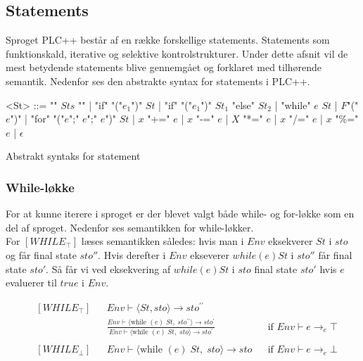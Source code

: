\noindent \subsection{Statements}
Sproget PLC++ består af en række forskellige statements. Statements som funktionskald, iterative og selektive kontrolstrukturer. Under dette afsnit vil de mest betydende statements blive gennemgået og forklaret med tilhørende semantik. Nedenfor ses den abstrakte syntax for statements i PLC++.

\begin{Grammar}
 \begin{grammar}
 <St> ::= "{" $Sts$ "}" | "if" "("$e_1$")" $St$ | "if" "("$e_1$")" $St_1$ "else" $St_2$ | "while" $e$ $St$ | $F$"("$e$")" | "for" "("$e$";" $e$";" $e$")" $St$ | $x$ "+=" $e$ | $x$ "-=" $e$ | $X$ "*=" $e$ | $x$ "/=" $e$ | $x$ "\%=" $e$ | $\epsilon$
 \end{grammar}
 \caption{Abstrakt syntaks for statement}\label{gra:Statements}
\end{Grammar}


\subsubsection*{While-løkke}
For at kunne iterere i sproget er der blevet valgt både while- og for-løkke som en del af sproget. Nedenfor ses semantikken for while-løkker. \\

\noindent For $[WHILE_\top]$ læses semantikken således: 
hvis man i $Env$ eksekverer $St$ i $sto$ og får final state $sto''$. Hvis derefter i $Env$ ekseverer $while(e) St$ i $sto''$ får final state $sto'$. Så får vi ved eksekvering af $while(e) St$ i $sto$ final state $sto'$ hvis $e$ evaluerer til $true$ i $Env$.

\begin{align*}
&[WHILE_\top] & &Env \vdash \langle St, sto \rangle \rightarrow sto^{\prime\prime}\\
& & &\frac{Env \vdash \langle \text{while } (e)\; St,\; sto^{\prime\prime} \rangle \rightarrow sto^\prime}{Env \vdash \langle \text{while } (e)\; St,\; sto \rangle \rightarrow sto^\prime} & &\text{if } Env \vdash e \rightarrow_e \top\\\\
%
&[WHILE_\bot] & &Env \vdash \langle \text{while } (e)\; St,\; sto \rangle \rightarrow sto & &\text{if } Env \vdash e \rightarrow_e \bot\\\\
\end{align*}

